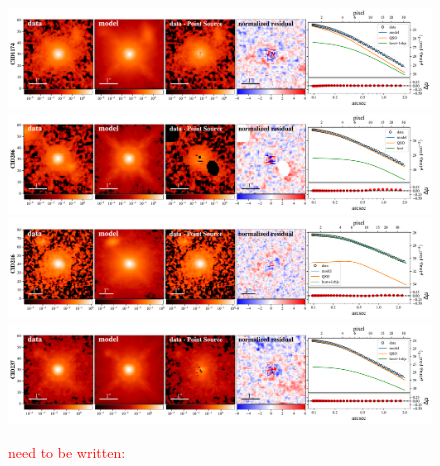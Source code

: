\documentclass[apj]{emulateapj}
\begin{document}
\begin{figure}
\centering
{
\includegraphics[height=0.25\textwidth]{fig/best_fit_CID1174_SB_profile.pdf}
\includegraphics[height=0.25\textwidth]{fig/best_fit_CID206_SB_profile.pdf}
\includegraphics[height=0.25\textwidth]{fig/best_fit_CID216_SB_profile.pdf}
\includegraphics[height=0.25\textwidth]{fig/best_fit_CID237_SB_profile.pdf}
\caption{\label{fig:QSO_decomp} 
\textcolor{red}{need to be written:}
}}
\end{figure} 
\end{document}
